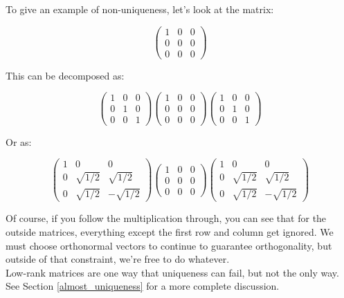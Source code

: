 \documentclass{amsbook}
\begin{document}
\begin{tcolorbox}[title=Example,colback=blue!5]
To give an example of non-uniqueness, let's look at the matrix:

$$
\left(\begin{array}{ccc}1&0&0\\0&0&0\\0&0&0\end{array}\right)
$$

This can be decomposed as:

$$
\left(\begin{array}{ccc}1&0&0\\0&1&0\\0&0&1\end{array}\right)
\left(\begin{array}{ccc}1&0&0\\0&0&0\\0&0&0\end{array}\right)
\left(\begin{array}{ccc}1&0&0\\0&1&0\\0&0&1\end{array}\right)
$$

Or as:

$$
\left(\begin{array}{ccc}1&0&0\\0&\sqrt{1/2}&\sqrt{1/2}\\0&\sqrt{1/2}&-\sqrt{1/2}\end{array}\right)
\left(\begin{array}{ccc}1&0&0\\0&0&0\\0&0&0\end{array}\right)
\left(\begin{array}{ccc}1&0&0\\0&\sqrt{1/2}&\sqrt{1/2}\\0&\sqrt{1/2}&-\sqrt{1/2}\end{array}\right)
$$

Of course, if you follow the multiplication through, you can see that for the outside matrices, everything except the first row and column get ignored.  We must choose orthonormal vectors to continue to guarantee orthogonality, but outside of that constraint, we're free to do whatever.\\

Low-rank matrices are one way that uniqueness can fail, but not the only way.  See Section \ref{almost_uniqueness} for a more complete discussion.
\end{tcolorbox}
\end{document}

